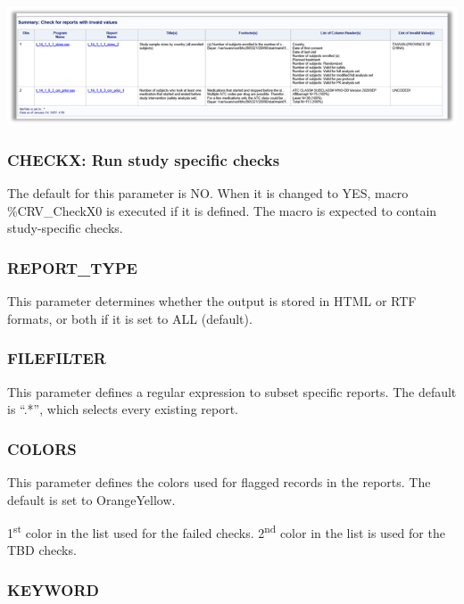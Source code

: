 \documentclass[
  letterpaper,
  DIV=11,
  numbers=noendperiod]{scrartcl}
\begin{document}
\includegraphics{image/Picture14.png}

\hypertarget{checkx-run-study-specific-checks}{%
\subsubsection{CHECKX: Run study specific
checks}\label{checkx-run-study-specific-checks}}

The default for this parameter is NO. When it is changed to YES, macro
\%CRV\_CheckX0 is executed if it is defined. The macro is expected to
contain study-specific checks.

\hypertarget{report_type}{%
\subsubsection{REPORT\_TYPE}\label{report_type}}

This parameter determines whether the output is stored in HTML or RTF
formats, or both if it is set to ALL (default).

\hypertarget{filefilter}{%
\subsubsection{FILEFILTER}\label{filefilter}}

This parameter defines a regular expression to subset specific reports.
The default is ``.*'', which selects every existing report.

\hypertarget{colors}{%
\subsubsection{COLORS}\label{colors}}

This parameter defines the colors used for flagged records in the
reports. The default is set to Orange\textbar Yellow.

1\textsuperscript{st} color in the list used for the failed checks.
2\textsuperscript{nd} color in the list is used for the TBD checks.~

\hypertarget{keyword}{%
\subsubsection{KEYWORD}\label{keyword}}
\end{document}
